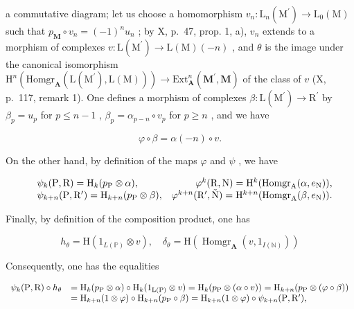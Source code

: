 a commutative diagram; let us choose a homomorphism \(v_{n}: \mathrm{L}_{n}(\mathrm{M}^{\prime}) \to \mathrm{L}_{0}(\mathrm{M})\) such that \(p_{\mathbf{M}} \circ v_{n} = (-1)^{n} u_{n}\) ; by X, p.~47, prop. 1, a), \(v_{n}\) extends to a morphism of complexes \(v: \mathrm{L}(\mathrm{M}^{\prime}) \to \mathrm{L}(\mathrm{M})(-n)\) , and \(\theta\) is the image under the canonical isomorphism \(\mathrm{H}^{n}(\mathrm{Homgr}_{\mathbf{A}}(\mathrm{L}(\mathrm{M}^{\prime}), \mathrm{L}(\mathrm{M}))) \to \mathrm{Ext}_{\mathbf{A}}^{n}(\mathbf{M}^{\prime}, \mathbf{M})\) of the class of \(v\) (X, p.~117, remark 1). One defines a morphism of complexes \(\beta: \mathrm{L}(\mathrm{M}^{\prime}) \to \mathrm{R}^{\prime}\) by \(\beta_{p} = u_{p}\) for \(p \leqslant n - 1\) , \(\beta_{p} = \alpha_{p-n} \circ v_{p}\) for \(p \geqslant n\) , and we have

\[
\varphi \circ \beta = \alpha (- n) \circ v.
\]

On the other hand, by definition of the maps \(\varphi\) and \(\psi\) , we have

\[
\begin{array}{r l r} & {\psi_ {k} (\mathrm{P}, \mathrm{R}) = \mathrm{H} _ {k} (p _ {\mathrm{P}} \otimes \alpha),} & {\varphi^ {k} (\mathrm{R}, \mathrm{N}) = \mathrm{H} ^ {k} (\mathrm{Homgr} _ {\mathrm{A}} (\alpha , e _ {\mathrm{N}})),} \\ & {\psi_ {k + n} (\mathrm{P}, \mathrm{R} ^ {\prime}) = \mathrm{H} _ {k + n} (p _ {\mathrm{P}} \otimes \beta),} & {\varphi^ {k + n} (\mathrm{R} ^ {\prime}, \tilde {\mathrm{N}}) = \mathrm{H} ^ {k + n} (\mathrm{Homgr} _ {\mathrm{A}} (\beta , e _ {\mathrm{N}})).} \end{array}
\]

Finally, by definition of the composition product, one has

\[
h _ {\theta} = \mathrm{H} (1 _ {L (\mathbb {P})} \otimes v), \quad \delta_ {\theta} = \mathrm{H} (\operatorname{Homgr} _ {\mathbf {A}} (v, 1 _ {I (\mathbb {N})}))
\]

Consequently, one has the equalities

\[
\begin{array}{r l} \psi_ {k} (\mathrm{P}, \mathrm{R}) \circ h _ {\theta} & = \mathrm{H} _ {k} (p _ {\mathrm{P}} \otimes \alpha) \circ \mathrm{H} _ {k} (1 _ {\mathrm{L(P)}} \otimes v) = \mathrm{H} _ {k} (p _ {\mathrm{P}} \otimes (\alpha \circ v)) = \mathrm{H} _ {k + n} (p _ {\mathrm{P}} \otimes (\varphi \circ \beta)) \\ & = \mathrm{H} _ {k + n} (1 \otimes \varphi) \circ \mathrm{H} _ {k + n} (p _ {\mathrm{P}} \circ \beta) = \mathrm{H} _ {k + n} (1 \otimes \varphi) \circ \psi_ {k + n} (\mathrm{P}, \mathrm{R} ^ {\prime}), \end{array}
\]

